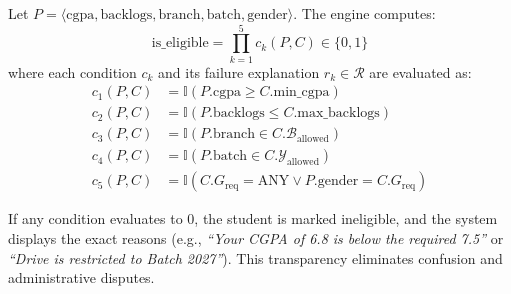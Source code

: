 \documentclass[conference]{IEEEtran}
\begin{document}
Let $P = \langle \text{cgpa}, \text{backlogs}, \text{branch}, \text{batch}, \text{gender} \rangle$. The engine computes:
\begin{equation}
\mathrm{is\_eligible} = \prod_{k=1}^{5} c_k(P, C) \in \{0, 1\}
\end{equation}
where each condition $c_k$ and its failure explanation $r_k \in \mathcal{R}$ are evaluated as:
\begin{equation}
\begin{aligned}
c_1(P, C) &= \mathbb{I}(P.\text{cgpa} \ge C.\text{min\_cgpa}) \\
c_2(P, C) &= \mathbb{I}(P.\text{backlogs} \le C.\text{max\_backlogs}) \\
c_3(P, C) &= \mathbb{I}(P.\text{branch} \in C.\mathcal{B}_{\text{allowed}}) \\
c_4(P, C) &= \mathbb{I}(P.\text{batch} \in C.\mathcal{Y}_{\text{allowed}}) \\
c_5(P, C) &= \mathbb{I}(C.G_{\text{req}} = \text{ANY} \lor P.\text{gender} = C.G_{\text{req}})
\end{aligned}
\end{equation}

If any condition evaluates to 0, the student is marked ineligible, and the system displays the exact reasons (e.g., \textit{``Your CGPA of 6.8 is below the required 7.5''} or \textit{``Drive is restricted to Batch 2027''}). This transparency eliminates confusion and administrative disputes.
\end{document}
